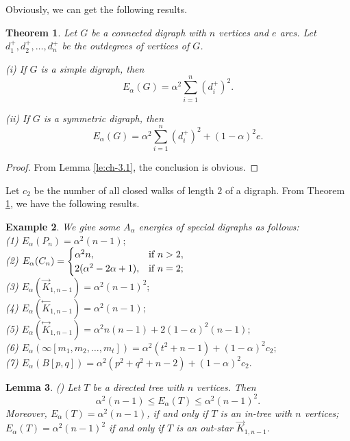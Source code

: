 \documentclass[11pt]{article}
\newtheorem{theorem}{Theorem}[section]
\newtheorem{lemma}[theorem]{Lemma}
\newtheorem{example}[theorem]{Example}
\begin{document}
Obviously, we can get the following results.

\noindent\begin{theorem}\label{th:ch-3.2} Let $G$ be a connected digraph with $n$ vertices and $e$ arcs. Let $d_1^+,d_2^+,\ldots,d_n^+$ be the outdegrees of vertices of $G$.

(i) If $G$ is a simple digraph, then
$$E_\alpha(G)=\alpha^2\sum_{i=1}^n (d_i^+)^2.$$

(ii) If $G$ is a symmetric digraph, then
$$E_\alpha(G)=\alpha^2\sum_{i=1}^n (d_i^+)^2+(1-\alpha)^2 e.$$
\end{theorem}
\begin{proof}
From Lemma \ref{le:ch-3.1}, the conclusion is obvious.
\end{proof}


 Let $c_2$ be the number of all closed walks of length $2$ of  a digraph. From Theorem \ref{th:ch-3.2}, we have the following results.
\noindent\begin{example}\label{ex:ch-3.3} We give some $A_\alpha$ energies of special digraphs as follows: \\
(1) $E_\alpha(P_n)=\alpha^2(n-1);$\\
(2) $E_\alpha(C_n)=
\begin{cases}
\alpha^2n, & \textnormal{if}\ n>2,\\
2(\alpha^2-2\alpha+1), & \textnormal{if}\ n=2;
\end{cases}$\\
(3) $E_\alpha(\stackrel{\rightarrow}{K}_{1,n-1})=\alpha^2(n-1)^2;$\\
(4) $E_\alpha(\stackrel{\leftarrow}{K}_{1,n-1})=\alpha^2(n-1);$\\
(5) $E_\alpha(\stackrel{\leftrightarrow}{K}_{1,n-1})=\alpha^2 n(n-1)+2(1-\alpha)^2(n-1);$\\
(6) $E_\alpha(\infty[m_1,m_2,\ldots,m_t])=\alpha^2(t^2+n-1)+(1-\alpha)^2c_2;$\\
(7) $E_\alpha(B[p,q])=\alpha^2(p^2+q^2+n-2)+(1-\alpha)^2c_2.$
\end{example}

\noindent\begin{lemma}\label{le:ch-3.4}(\cite{Xi}) Let $T$ be a directed tree with $n$ vertices. Then
$$\alpha^2(n-1)\leq E_\alpha(T)\leq\alpha^2(n-1)^2.$$
Moreover, $E_\alpha(T)=\alpha^2(n-1)$, if and only if $T$ is an in-tree with $n$ vertices; $E_\alpha(T)=\alpha^2(n-1)^2$ if and only if $T$ is an out-star $\stackrel{\rightarrow}{K}_{1,n-1}$.
\end{lemma}
\end{document}
